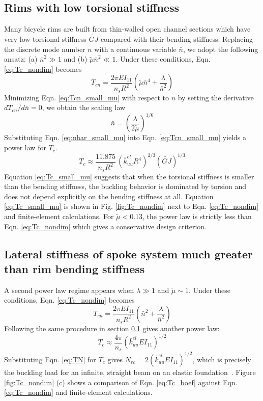 \documentclass{bmd2016p}
\begin{document}
\subsection{Rims with low torsional stiffness}\label{sec:powerlaw_1}
Many bicycle rims are built from thin-walled open channel sections which have very low torsional stiffness $\widetilde{GJ}$ compared with their bending stiffness. Replacing the discrete mode number $n$ with a continuous variable $\bar{n}$, we adopt the following ansatz: (a) $\bar{n}^2 \gg 1$ and (b) $\tilde{\mu}\bar{n}^2 \ll 1$. Under these conditions, Eqn. \ref{eq:Tc_nondim} becomes
	\begin{equation}\label{eq:Tcn_small_mu}
	T_{cn} = \frac{2\pi EI_{11}}{n_sR^2} \left( \tilde{\mu}\bar{n}^4 + \frac{\lambda}{\bar{n}^2}\right)
	\end{equation}
Minimizing Eqn. \ref{eq:Tcn_small_mu} with respect to $\bar{n}$ by setting the derivative $dT_{cn}/d\bar{n}=0$, we obtain the scaling law
	\begin{equation}\label{eq:nbar_small_mu}
	\bar{n} = \left(\frac{\lambda}{2\tilde{\mu}} \right)^{1/6}
	\end{equation}
Substituting Eqn. \ref{eq:nbar_small_mu} into Eqn. \ref{eq:Tcn_small_mu} yields a power law for $T_c$.
	\begin{equation}\label{eq:Tc_small_mu}
	T_c \approx \frac{11.875}{n_sR^2} \, \left(\bar{k}_{uu}^{el}R^4 \right)^{2/3} (\widetilde{GJ})^{1/3}
	\end{equation}
Equation \ref{eq:Tc_small_mu} suggests that when the torsional stiffness is smaller than the bending stiffness, the buckling behavior is dominated by torsion and does not depend explicitly on the bending stiffness at all. Equation \ref{eq:Tc_small_mu} is shown in Fig. \ref{fig:Tc_nondim} next to Eqn. \ref{eq:Tc_nondim} and finite-element calculations. For $\tilde{\mu}<0.13$, the power law is strictly less than Eqn. \ref{eq:Tc_nondim} which gives a conservative design criterion.


\subsection{Lateral stiffness of spoke system much greater than rim bending stiffness}
A second power law regime appears when $\lambda \gg 1$ and $\tilde{\mu} \sim 1$. Under these conditions, Eqn. \ref{eq:Tc_nondim} becomes
	\begin{equation}\label{eq:Tcn_boef}
	T_{cn} = \frac{2\pi EI_{11}}{n_sR^2}\left(\bar{n}^2 + \frac{\lambda}{\bar{n}^2} \right)
	\end{equation}
Following the same procedure in section \ref{sec:powerlaw_1} gives another power law:
	\begin{equation}\label{eq:Tc_boef}
	T_c \approx \frac{4\pi}{n_s} \left(\bar{k}_{uu}^{el}EI_{11} \right)^{1/2} 
	\end{equation}
Substituting Eqn. \ref{eq:TN} for $T_c$ gives $N_{rc}=2\left(\bar{k}_{uu}^{el}EI_{11}\right)^{1/2}$, which is precisely the buckling load for an infinite, straight beam on an elastic foundation~\cite{Hetenyi1946b}. Figure \ref{fig:Tc_nondim} (c) shows a comparison of Eqn. \ref{eq:Tc_boef} against Eqn. \ref{eq:Tc_nondim} and finite-element calculations.
\end{document}
